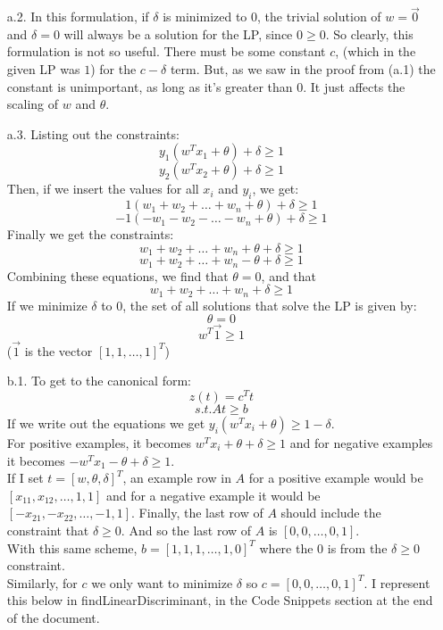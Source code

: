 \begin{enumerate}
\begin{enumerate}
        \item[a.2.]
                In this formulation, if $\delta$ is minimized to $0$, the trivial solution of $w = \vec{0}$ and $\delta = 0$ will always be a solution for the LP, since $0 \geq 0$. So clearly, this formulation is not so useful. There must be some constant $c$, (which in the given LP was $1$) for the $c-\delta$ term. But, as we saw in the proof from (a.1) the constant is unimportant, as long as it's greater than $0$. It just affects the scaling of $w$ and $\theta$.
        \item[a.3.]
                Listing out the constraints:
                $$y_1(w^Tx_1+\theta)+\delta \geq 1$$
                $$y_2(w^Tx_2+\theta)+\delta \geq 1$$
                Then, if we insert the values for all $x_i$ and $y_i$, we get:\\
                $$1(w_1+w_2+\ldots+w_n+\theta)+\delta \geq 1$$
                $$-1(-w_1-w_2-\ldots-w_n+\theta)+\delta \geq 1$$
                Finally we get the constraints:
                $$w_1+w_2+\ldots+w_n+\theta+\delta \geq 1$$
                $$w_1+w_2+\ldots+w_n-\theta+\delta \geq 1$$
                Combining these equations, we find that $\theta = 0$, and that
                $$w_1+w_2+\ldots+w_n + \delta \geq 1$$
                If we minimize $\delta$ to $0$, the set of all solutions that solve the LP is given by:
                $$\theta = 0$$
                $$w^T\vec{1} \geq 1$$
                ($\vec{1}$ is the vector $[1,1,\ldots,1]^T$)
        \item[b.1.]
                To get to the canonical form:
                   $$z(t) = c^Tt$$
                   $$s.t. At \geq b$$
                If we write out the equations we get $y_i(w^Tx_i+\theta) \geq 1-\delta$. \\
                For positive examples, it becomes $w^Tx_i+\theta+\delta \geq 1$ and for negative examples it becomes $-w^Tx_1-\theta+\delta \geq 1$.\\          
                If I set $t = [w,\theta,\delta]^T$, an example row in $A$ for a positive example would be $[x_{11},x_{12},\ldots,1,1]$ and for a negative example it would be $[-x_{21},-x_{22},\ldots,-1,1]$. Finally, the last row of $A$ should include the constraint that $\delta \geq 0$. And so the last row of $A$ is $[0,0,\ldots,0,1]$. \\
                With this same scheme, $b = [1,1,1,\ldots,1,0]^T$ where the 0 is from the $\delta \geq 0$ constraint.\\
                Similarly, for $c$ we only want to minimize $\delta$ so $c=[0,0,\ldots,0,1]^T$. I represent this below in findLinearDiscriminant, in the Code Snippets section at the end of the document.\\


\end{enumerate}
\end{enumerate}
